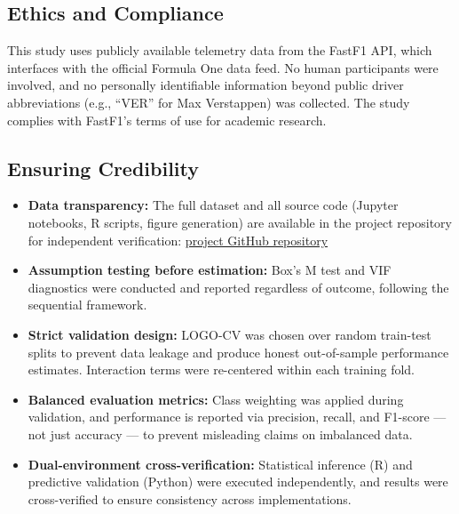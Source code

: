 \subsection{Ethics and Compliance}

This study uses publicly available telemetry data from the FastF1 API, which
interfaces with the official Formula One data feed. No human participants
were involved, and no personally identifiable information beyond public
driver abbreviations (e.g., ``VER'' for Max Verstappen) was collected. The
study complies with FastF1's terms of use for academic research.

\subsection{Ensuring Credibility}

\begin{itemize}
  \item \textbf{Data transparency:} The full dataset and all source code
    (Jupyter notebooks, R scripts, figure generation) are available in the
    project repository for independent verification:
    \href{https://github.com/z-sulit/Predicting-Formula-One-F1-Face-Finishing-Tiers-Using-Conditions-and-Strategies}{project GitHub repository}
  \item \textbf{Assumption testing before estimation:} Box's M test and VIF
    diagnostics were conducted and reported regardless of outcome, following
    the sequential framework.
  \item \textbf{Strict validation design:} LOGO-CV was chosen over random
    train-test splits to prevent data leakage and produce honest out-of-sample
    performance estimates. Interaction terms were re-centered within each
    training fold.
  \item \textbf{Balanced evaluation metrics:} Class weighting was applied
    during validation, and performance is reported via precision, recall,
    and F1-score --- not just accuracy --- to prevent misleading claims on
    imbalanced data.
  \item \textbf{Dual-environment cross-verification:} Statistical inference
    (R) and predictive validation (Python) were executed independently, and
    results were cross-verified to ensure consistency across implementations.
\end{itemize}

